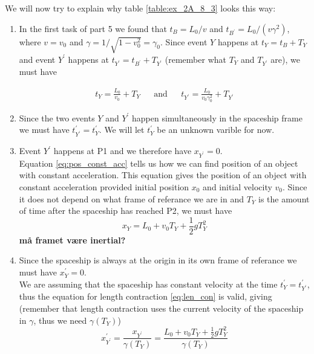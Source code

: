 \documentclass[a4paper,10pt,english]{article}
\begin{document}
\begin{enumerate}
\begin{enumerate}
We will now try to explain why table \ref{table:ex_2A_8_3} looks this way:
\begin{enumerate} %
\item In the first task of part 5 we found that $t_{B}=L_{0}/v$ and $t_{B^{\prime}}=L_{0}/(v\gamma^{2})$, where $v=v_{0}$ and $\gamma=1/\sqrt{1-v_{0}^{2}}=\gamma_{0}$. Since event $Y$ happens at $t_{Y}=t_{B}+T_{Y}$ and event $Y^{\prime}$ happens at $t_{Y^{\prime}}=t_{B^{\prime}}+T_{Y^{\prime}}$ (remember what $T_{Y}$ and $T_{Y^{\prime}}$ are), we must have 

\begin{align}\label{eq:t_Y}t_{Y}=\frac{L_{0}}{v_{0}}+T_{Y} && \text{and} && t_{Y^{\prime}}=\frac{L_{0}}{v_{0}\gamma_{0}^{2}}+T_{Y^{\prime}}\end{align}

\item Since the two events $Y$ and $Y^{\prime}$ happen simultaneously in the spaceship frame we must have $t^{\prime}_{Y^{\prime}}=t_{Y}^{\prime}$. We will let $t_{Y}^{\prime}$ be an unknown varible for now.

\item Event $Y^{\prime}$ happens at P1 and we therefore have $x_{Y^{\prime}}=0$.\\
Equation \ref{eq:pos_const_acc} tells us how we can find position of an object with constant acceleration. This equation gives the position of an object with constant acceleration provided initial position \(x_0\) and initial velocity \(v_0\). Since it does not depend on what frame of referance we are in %
and $T_{Y}$ is the amount of time after the spaceship has reached P2, we must have \[x_{Y}=L_{0}+v_{0}T_{Y}+\frac{1}{2}gT_{Y}^{2}\]
\textbf{må framet være inertial?}
\item Since the spaceship is always at the origin in its own frame of referance we must have $x^{\prime}_{Y}=0$.\\
We are assuming that the spaceship has constant velocity at the time $t^{\prime}_{Y}=t^{\prime}_{Y^{\prime}}$, thus the equation for length contraction \ref{eq:len_con} is valid, giving (remember that length contraction uses the current velocity of the spaceship in $\gamma$, thus we need $\gamma(T_{Y})$) \[x^{\prime}_{Y^{\prime}}=\frac{x_{Y^{\prime}}}{\gamma(T_{Y})}=\frac{L_{0}+v_{0}T_{Y}+\frac{1}{2}gT_{Y}^{2}}{\gamma(T_{Y})}\]
\end{enumerate} %


\end{enumerate}
\end{enumerate}
\end{document}
